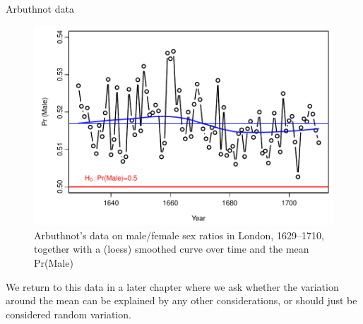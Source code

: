 \documentclass[11pt]{book}\usepackage[]{graphicx}\usepackage[]{color}
\newenvironment{knitrout}{}{} %
\renewenvironment{knitrout}{\small\renewcommand{\baselinestretch}{.85}}{} %
\begin{document}
\begin{Example}[arbuthnot1]{Arbuthnot data}
\begin{knitrout}
\begin{figure}[htbp]
\centerline{\includegraphics[width=.75\textwidth]{ch03/fig/arbuthnot1} }

\caption[Arbuthnot's data on male/female sex ratios]{Arbuthnot's data on male/female sex ratios in London, 1629--1710, together with a (loess) smoothed curve over time and the mean Pr(Male)\label{fig:arbuthnot1}}
\end{figure}


\end{knitrout}

We return to this data in a later chapter where we ask whether the variation around
the mean can be explained by any other considerations, or should just be considered 
random variation.
\end{Example}
\end{document}
